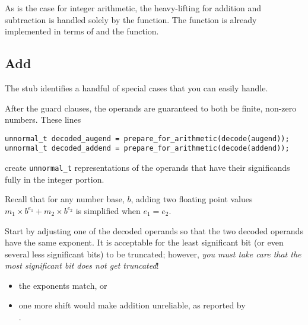 As is the case for integer arithmetic, the heavy-lifting for addition and subtraction is handled solely by the  function.
The  function is already implemented in terms of  and the  function.

\subsection{Add}

The  stub identifies a handful of special cases that you can easily handle.
\begin{description}
\end{description}

After the guard clauses, the operands are guaranteed to both be finite, non-zero numbers.
These lines
\begin{lstlisting}
unnormal_t decoded_augend = prepare_for_arithmetic(decode(augend));
unnormal_t decoded_addend = prepare_for_arithmetic(decode(addend));
\end{lstlisting}
create \lstinline{unnormal_t} representations of the operands that have their significands fully in the integer portion.

Recall that for any number base, $b$, adding two floating point values $m_1 \times b^{e_1} + m_2 \times b^{e_2}$ is simplified when $e_1 = e_2$.

Start by adjusting one of the decoded operands so that the two decoded operands have the same exponent.
It is acceptable for the least significant bit (or even several less significant bits) to be truncated;
however, \textit{you must take care that the most significant bit does not get truncated}!


\begin{description}
    \begin{itemize}
        \item the exponents match, or
        \item one more shift would make addition unreliable, as reported by \\ .
    \end{itemize}
\end{description}

